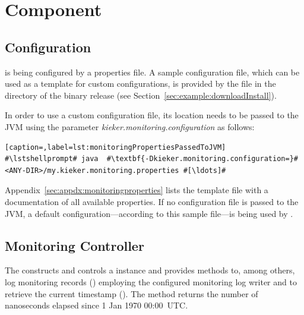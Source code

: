 % 


\chapter{\KiekerMonitoringPart{} Component}\label{chap:componentsMonitoring}


\section{\KiekerMonitoringPart{} Configuration}\label{sec:monitoring:configuration}

\KiekerMonitoringPart{} is being configured by a properties file. A sample %
configuration file, which can be used as a template for custom configurations, %
is provided by the file \file{\monitoringPropertiesFile} in the directory %
 of the binary release %
(see Section~\ref{sec:example:downloadInstall}). %

In order to use a custom configuration file, its location needs to be passed to %
the JVM using the parameter \textit{kieker.monitoring.configuration} as follows:

\setBashListing
\begin{lstlisting}[caption=,label=lst:monitoringPropertiesPassedToJVM]
#\lstshellprompt# java	#\textbf{-Dkieker.monitoring.configuration=}#<ANY-DIR>/my.kieker.monitoring.properties #[\ldots]#
\end{lstlisting}

\noindent Appendix~\ref{sec:appdx:monitoringproperties} lists the template file %
with a documentation of all available properties. If no configuration file %
is passed to the JVM, a default configuration---according to this sample file---is being %
used by \KiekerMonitoringPart{}. %

\section{Monitoring Controller}\label{sec:componentsMonitoring:monitoringController}

The  constructs and controls a \KiekerMonitoringPart{} %
instance and provides methods to, among others, log monitoring records %
() employing the configured monitoring log writer and %
to retrieve the current timestamp (). %
The method  returns the number of nanoseconds elapsed %
since 1 Jan 1970 00:00~UTC. %

